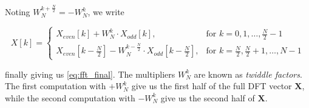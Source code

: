 \documentclass[8pt]{extarticle}
\begin{document}
Noting $W_N^{k +\frac{N}{2}}=-W_{N}^{k}$, we write

\begin{equation*}
    X[k] = 
    \begin{cases}
    X_{even}[k] + W_N^{k} \cdot X_{odd}[k], & \text{for } k = 0,1,\ldots,\frac{N}{2}-1 \\
    X_{even}\left[k-\frac{N}{2}\right] - W_N^{k-\frac{N}{2}} \cdot X_{odd}\left[k-\frac{N}{2}\right], & \text{for } k = \frac{N}{2},\frac{N}{2}+1,\ldots,N-1
\end{cases}
\end{equation*}

finally giving us \autoref{eq:fft_final}. The multipliers $W_N^k$ are known as \textit{twiddle factors}. The first computation with $+W_N^k$ give us the first half of the full DFT vector $\mathbf{X}$, while the second computation with $-W_N^k$ give us the second half of $\mathbf{X}$.

\newpage

\nocite{*}
\end{document}
